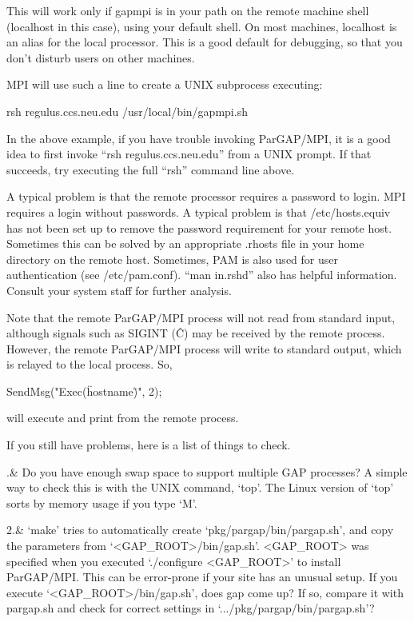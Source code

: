 This will work only if gapmpi is in your path on the remote machine
shell (localhost in this case), using your default shell.  On most
machines, localhost is an alias for the local processor.  This is a
good default for debugging, so that you don't disturb users on other
machines.

MPI will use such a line to create a UNIX subprocess executing:

\begintt
   rsh regulus.ccs.neu.edu /usr/local/bin/gapmpi.sh
\endtt

In the above example, if you have trouble invoking ParGAP/MPI, it is a
good idea to first invoke ``rsh regulus.ccs.neu.edu'' from a UNIX
prompt.  If that succeeds, try executing the full ``rsh'' command line
above.

A typical problem is that the remote processor requires a password to
login.  MPI requires a login without passwords.  A typical problem is
that /etc/hosts.equiv has not been set up to remove the password
requirement for your remote host.  Sometimes this can be solved by an
appropriate .rhosts file in your home directory on the remote host.
Sometimes, PAM is also used for user authentication (see
/etc/pam.conf).  ``man in.rshd'' also has helpful information.  Consult
your system staff for further analysis.

Note that the remote ParGAP/MPI process will not read from standard
input, although signals such as SIGINT (\^C) may be received by the
remote process.  However, the remote ParGAP/MPI process will write to
standard output, which is relayed to the local process.  So,

\begintt
        SendMsg("Exec(\"hostname\")", 2);
\endtt

will execute and print from the remote process.


If you still have problems, here is a list of things to check.

.& Do you have enough swap space to support multiple GAP processes?
    A simple way to check this is with the UNIX command, `top'.
    The Linux version of `top' sorts by memory usage if you type `M'.

2.& `make' tries to automatically create
     `pkg/pargap/bin/pargap.sh', and copy the
     parameters from `<GAP_ROOT>/bin/gap.sh'.
     <GAP_ROOT> was specified when you executed `./configure
     <GAP_ROOT>' to install ParGAP/MPI.
     This can be error-prone if your site has an unusual setup.
     If you execute `<GAP_ROOT>/bin/gap.sh', does gap come up?
     If so, compare it with pargap.sh and check for
     correct settings in `.../pkg/pargap/bin/pargap.sh'?

